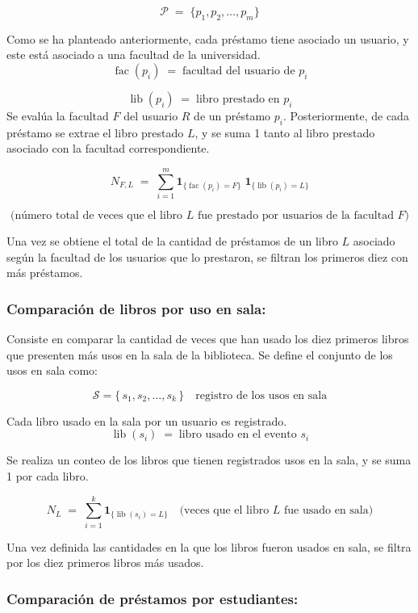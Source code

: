 \documentclass[spanish]{ieee_upb}
\begin{document}
\[
  \mathcal{P}\;=\;\{
      p_1,p_2,\dots,p_m
  \}
\]

Como se ha planteado anteriormente, cada préstamo tiene asociado un usuario, y este está asociado a una facultad de la universidad. 
\[
  \operatorname{fac}(p_i)          \;=\; \text{facultad del usuario de }p_i
\]

\[
  \operatorname{lib}(p_i)          \;=\; \text{libro prestado en }p_i
\]
Se evalúa la facultad \(F\) del usuario \(R\) de un préstamo \(p_i\). Posteriormente, de cada préstamo se extrae el libro prestado \(L\), y se suma 1 tanto al libro prestado asociado con la facultad correspondiente. 

\[
  N_{F,L}\;=\;
  \sum_{i=1}^{m}
    \mathbf 1_{\{\operatorname{fac}(p_i)=F\}}
    \;\mathbf 1_{\{\operatorname{lib}(p_i)=L\}}
\]

\[
  \text{(número total de veces que el libro }L\text{ fue prestado por usuarios de la facultad }F)
\]

Una vez se obtiene el total de la cantidad de préstamos de un libro \(L\) asociado según la facultad de los usuarios que lo prestaron, se filtran los primeros diez con más préstamos. 

\subsubsection{Comparación de libros por uso en sala: }
Consiste en comparar la cantidad de veces que han usado  los diez primeros libros que presenten más usos en la sala de la biblioteca. Se define el conjunto de los usos en sala como:


\[
  \mathcal{S}= \{\,s_1,s_2,\dots,s_k\,\}
  \quad\text{registro de los usos en sala}
\]

Cada libro usado en la sala por un usuario es registrado.
\[
  \operatorname{lib}(s_i)
  \;=\;
  \text{libro usado en el evento }s_i
\]

Se realiza un conteo de los libros que tienen registrados usos en la sala, y se suma 1 por cada libro.

\[
  N_{L}
  \;=\;
  \sum_{i=1}^{k}
    \mathbf 1_{\{\operatorname{lib}(s_i)=L\}}
  \quad
  \bigl(\text{veces que el libro }L\text{ fue usado en sala}\bigr)
\]

Una vez definida las cantidades en la que los libros fueron usados en sala, se filtra por los diez primeros libros más usados.

\subsubsection{Comparación de préstamos por estudiantes: }
\end{document}
